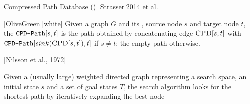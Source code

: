 \begin{frame}{Compressed Path Database (\CPD{}) [Strasser 2014 et al.]}
\begin{minipage}{0.50\textwidth}
\begin{center}
        \end{center}     
    \end{minipage}

    \vspace{-9pt}
    \begin{coloredBlock}{\CPDPathName{}}[OliveGreen][white]
        Given a graph $G$ and its \CPD{}, source node $s$ and target node $t$, 
        the $\texttt{CPD-Path}[\-s\-,\-t\-]$ is the path obtained by concatenating edge $\textsc{CPD}{}[s, t]$ with $\texttt{CPD-Path}[\-sink(\textsc{CPD}{}[s, t])\-,\-t\-]$ if $s \not = t$; the empty path otherwise.
    \end{coloredBlock}
\end{frame}

\begin{frame}{\A*{} [Nilsson et al., 1972]}
    \begin{block}{\A*{}}
        Given a (usually large) weighted directed graph representing a search space, an initial state $s$ and a set of goal states $T$, 
        the search algorithm \A*{} looks for the shortest path by iteratively expanding the best node 
    \end{block}
\end{frame}